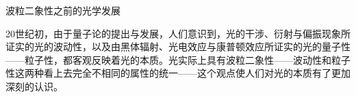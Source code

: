 
\begin{issues}
\issueTODO 波粒二象性之前的光学发展
\end{issues}

20世纪初，由于量子论的提出与发展，人们意识到，光的干涉、衍射与偏振现象所证实的光的波动性，以及由黑体辐射、光电效应与康普顿效应所证实的光的量子性——粒子性，都客观反映着光的本质。光实际上具有波粒二象性——波动性和粒子性这两种看上去完全不相同的属性的统一——这个观点使人们对光的本质有了更加深刻的认识。


